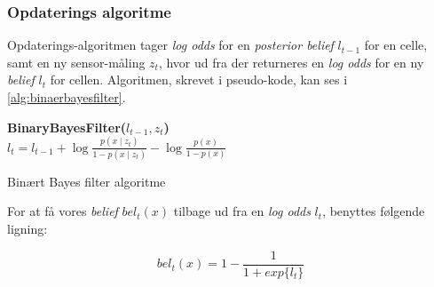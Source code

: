 \subsubsection{Opdaterings algoritme}
Opdaterings-algoritmen tager \textit{log odds} for en \textit{posterior belief} $l_{t-1}$ for en celle, samt en ny sensor-måling $z_t$, hvor ud fra der returneres en \textit{log odds} for en ny \textit{belief} $l_t$ for cellen.
Algoritmen, skrevet i pseudo-kode, kan ses i \cref{alg:binaerbayesfilter}.

\begin{algorithm}[h]
\textbf{BinaryBayesFilter($l_{t-1}, z_t$)} \\
\Indp $l_t = l_{t-1} + \log \frac{p(x \mid z_t)}{1-p(x \mid z_t)} - \log \frac{p(x)}{1-p(x)}$ \\
\caption{Binært Bayes filter algoritme}
\label{alg:binaerbayesfilter}
\end{algorithm}


For at få vores \textit{belief} $bel_t(x)$ tilbage ud fra en \textit{log odds} $l_t$, benyttes følgende ligning:

$$bel_t(x) = 1 - \frac{1}{1 + exp\{l_t\}}$$

